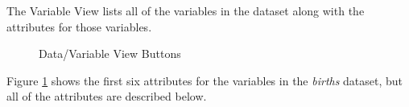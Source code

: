 The Variable View lists all of the variables in the dataset along with the attributes for those variables. 

\begin{figure}[H]
  \begin{center}
    \caption{Data/Variable View Buttons}
    \label{lab01_fig07}
  \end{center}
\end{figure}

Figure \ref{lab01_fig07} shows the first six attributes for the variables in the \textit{births} dataset, but all of the attributes are described below.

